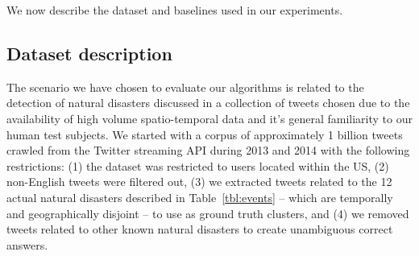 

We now describe the dataset and baselines used in our experiments.

\subsection{Dataset description}
The scenario we have chosen to evaluate our algorithms is related to the detection of natural disasters discussed in a collection of tweets chosen due to the availability of high volume spatio-temporal data and it's general familiarity to our human test subjects.  
We started with a corpus of approximately 1 billion tweets crawled from the Twitter streaming API during 2013 and 2014 with the following restrictions:
(1) the dataset was restricted to users located within the US, (2) non-English tweets were filtered out, (3) we extracted tweets related to the 12 actual natural disasters 
 described in Table~\ref{tbl:events}
-- which are temporally and geographically disjoint -- to use as ground truth clusters, and (4) we removed tweets related to other known natural disasters to create unambiguous correct answers. 




